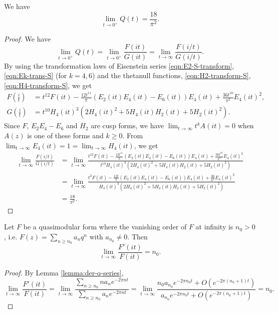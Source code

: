 \begin{lemma}\label{lemma:Qlim}\leanok
We have
\begin{equation}
    \lim_{t \to 0^+} Q(t) = \frac{18}{\pi^2}.
\end{equation}
\end{lemma}
\begin{proof}
We have
\begin{equation}
    \lim_{t \to 0^+} Q(t) = \lim_{t \to 0^+} \frac{F(it)}{G(it)} = \lim_{t \to \infty} \frac{F(i/t)}{G(i/t)}.
\end{equation}
By using the transformation laws of Eisenstein series \eqref{eqn:E2-S-transform}, \eqref{eqn:Ek-trans-S} (for $k = 4, 6$) and the thetanull functions, \eqref{eqn:H2-transform-S}, \eqref{eqn:H4-transform-S}, we get
\begin{align}
    F\left(\frac{i}{t}\right) &= t^{12} F(it) - \frac{12t^{11}}{\pi} (E_2(it)E_4(it) - E_6(it))E_4(it) + \frac{36t^{10}}{\pi^2}E_4(it)^2, \\
    G\left(\frac{i}{t}\right) &= t^{10} H_{4}(it)^{3}(2H_{4}(it)^{2} + 5 H_{4}(it)H_{2}(it) + 5 H_{2}(it)^{2}).
\end{align}
Since $F$, $E_2 E_4 - E_6$ and $H_2$ are cusp forms, we have $\lim_{t \to \infty}t^k A(it) = 0$ when $A(z)$ is one of these forms and $k \geq 0$.
From $\lim_{t \to \infty} E_4(it) = 1 = \lim_{t \to \infty}H_{4}(it)$, we get
\begin{align}
    \lim_{t \to \infty} \frac{F(i/t)}{G(i/t)}
    &= \lim_{t \to \infty} \frac{t^{12} F(it) - \frac{12t^{11}}{\pi} (E_2(it)E_4(it) - E_6(it))E_4(it) + \frac{36t^{10}}{\pi^2}E_4(it)^2}{t^{10} H_{4}(it)^{3}(2H_{4}(it)^{2} + 5 H_{4}(it)H_{2}(it) + 5 H_{2}(it)^{2})} \\
    &= \lim_{t \to \infty} \frac{t^{2} F(it) - \frac{12t}{\pi} (E_2(it)E_4(it) - E_6(it))E_4(it) + \frac{36}{\pi^2}E_4(it)^2}{H_{4}(it)^{3}(2H_{4}(it)^{2} + 5 H_{4}(it)H_{2}(it) + 5 H_{2}(it)^{2})} \\
    &= \frac{18}{\pi^2}.
\end{align}
\end{proof}

\begin{lemma}\label{lemma:log-der-inf}
Let $F$ be a quasimodular form where the vanishing order of $F$ at infinity is $n_0 > 0$, i.e. $F(z) = \sum_{n \geq n_0} a_n q^{n}$ with $a_{n_0} \ne 0$. Then
\begin{equation}
    \lim_{t \to \infty} \frac{F'(it)}{F(it)} = n_0.
\end{equation}
\end{lemma}
\begin{proof}
    By Lemma \ref{lemma:der-q-series},
    \begin{equation}
        \lim_{t \to \infty} \frac{F'(it)}{F(it)} = \lim_{t \to \infty} \frac{\sum_{n \ge n_0} n a_n e^{-2 \pi n t}}{\sum_{n \ge n_0} a_n e^{-2 \pi n t}} = \lim_{t \to \infty} \frac{n_0 a_{n_0} e^{-2 \pi n_0 t} + O(e^{-2 \pi (n_0 + 1) t})}{a_{n_0} e^{-2 \pi n_0 t} + O(e^{-2 \pi (n_0 + 1) t})} = n_0.
    \end{equation}
\end{proof}

